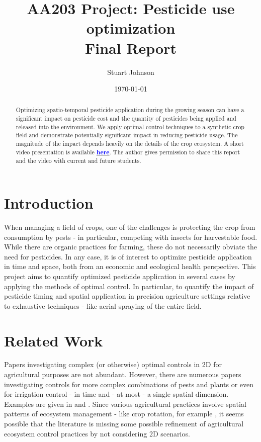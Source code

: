 \documentclass[11pt]{article}
\title{AA203 Project: Pesticide use optimization \\ Final Report}
\author{Stuart Johnson}
\affil{stujohn@stanford.edu}
\date{\today}
\begin{document}
\maketitle

\begin{abstract}
Optimizing spatio-temporal pesticide application during the growing season can have a significant impact on pesticide cost and the quantity of pesticides being applied and released into the environment. We apply optimal control techniques to a synthetic crop field and demonstrate potentially significant impact in reducing pesticide usage. The magnitude of the impact depends heavily on the details of the crop ecosystem.  A short video presentation is available \href{https://github.com/StuartGJohnson/AA203_project/blob/master/Optimal%20Control%20and%20Pesticides.mp4}{\textcolor{blue}{\textbf{here}}}. The author gives permission to share this report and the video with current and future students.
\end{abstract}

\section{Introduction}
When managing a field of crops, one of the challenges is protecting the crop from consumption by pests - in particular, competing with insects for harvestable food. While there are organic practices for farming, these do not necessarily obviate the need for pesticides. In any case, it is of interest to optimize pesticide application in time and space, both from an economic and ecological health perspective. This project aims to quantify optimized pesticide application in several cases by applying the methods of optimal control. In particular, to quantify the impact of pesticide timing and spatial application in precision agriculture settings relative to exhaustive techniques - like aerial spraying of the entire field.

\section{Related Work}
Papers investigating complex (or otherwise) optimal controls in 2D for agricultural purposes are not abundant. However, there are numerous papers investigating controls for more complex combinations of pests and plants or even for irrigation control - in time and - at most - a single spatial dimension. Examples are given in \cite{R1} and \cite{R2}. Since various agricultural practices involve spatial patterns of ecosystem management - like crop rotation, for example \cite{R3}, it seems possible that the literature is missing some possible refinement of agricultural ecosystem control practices by not considering 2D scenarios.
\end{document}
